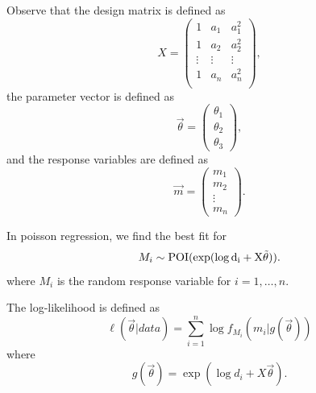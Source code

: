 \documentclass[
  10pt,
  twocolumn]{article}
\newenvironment{Shaded}{\begin{snugshade}}{\end{snugshade}}
\newcommand{\AttributeTok}[1]{\textcolor[rgb]{0.13,0.29,0.53}{#1}}
\newcommand{\ControlFlowTok}[1]{\textcolor[rgb]{0.13,0.29,0.53}{\textbf{#1}}}
\newcommand{\DecValTok}[1]{\textcolor[rgb]{0.00,0.00,0.81}{#1}}
\newcommand{\FunctionTok}[1]{\textcolor[rgb]{0.13,0.29,0.53}{\textbf{#1}}}
\newcommand{\NormalTok}[1]{#1}
\newcommand{\OtherTok}[1]{\textcolor[rgb]{0.56,0.35,0.01}{#1}}
\newcommand{\SpecialCharTok}[1]{\textcolor[rgb]{0.81,0.36,0.00}{\textbf{#1}}}
\newcommand{\StringTok}[1]{\textcolor[rgb]{0.31,0.60,0.02}{#1}}
\begin{document}
\begin{Shaded}
\end{Shaded}

Observe that the design matrix is defined as \[
X =
  \begin{pmatrix}
  1       & a_1 &     a_1^2\\
  1       & a_2       & a_2^2\\
  \vdots  & \vdots    & \vdots\\
  1       & a_n       & a_n^2\\
  \end{pmatrix},
\] the parameter vector is defined as \[
\vec{\theta} =
  \begin{pmatrix}
    \theta_1\\
    \theta_2\\
    \theta_3
  \end{pmatrix},
\] and the response variables are defined as \[
\vec{m} =
  \begin{pmatrix}
    m_1\\
    m_2\\
    \vdots\\
    m_n
  \end{pmatrix}.
\]

In poisson regression, we find the best fit for \[
  M_i \sim \rm{POI}(\exp(\log d_i + X \vec{\theta})).
\] where \(M_i\) is the random response variable for \(i=1,\ldots,n\).

The log-likelihood is defined as \[
  \ell(\vec{\theta} | data) = \sum_{i=1}^{n} \log f_{M_i}(m_i | g(\vec{\theta}))
\] where \[
  g(\vec{\theta}) = \exp(\log d_i +X \vec{\theta}).
\]
\end{document}
